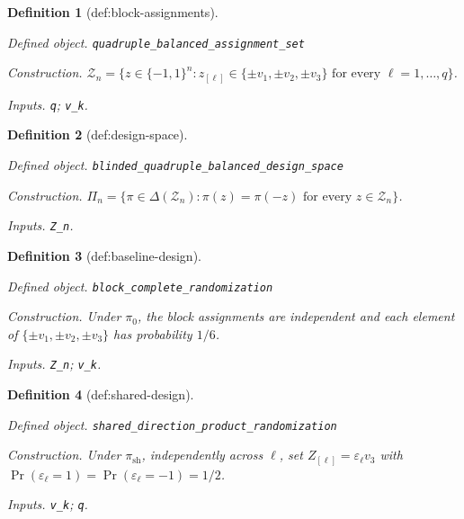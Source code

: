 \documentclass{article}
\newtheorem{definition}{Definition}
\begin{document}
\begin{definition}[def:block-assignments]\label{def:block-assignments}
\par\smallskip\noindent\emph{Defined object.} \texttt{quadruple\_\allowbreak{}balanced\_\allowbreak{}assignment\_\allowbreak{}set}
\par\smallskip\noindent\emph{Construction.} \(\mathcal Z_n=\{z\in\{-1,1\}^n:z_{[\ell]}\in\{\pm v_1,\pm v_2,\pm v_3\}\text{ for every }\ell=1,\ldots,q\}\).
\par\smallskip\noindent\emph{Inputs.} \texttt{q}; \texttt{v\_\allowbreak{}k}.
\end{definition}

\begin{definition}[def:design-space]\label{def:design-space}
\par\smallskip\noindent\emph{Defined object.} \texttt{blinded\_\allowbreak{}quadruple\_\allowbreak{}balanced\_\allowbreak{}design\_\allowbreak{}space}
\par\smallskip\noindent\emph{Construction.} \(\Pi_n=\{\pi\in\Delta(\mathcal Z_n):\pi(z)=\pi(-z)\text{ for every }z\in\mathcal Z_n\}\).
\par\smallskip\noindent\emph{Inputs.} \texttt{Z\_\allowbreak{}n}.
\end{definition}

\begin{definition}[def:baseline-design]\label{def:baseline-design}
\par\smallskip\noindent\emph{Defined object.} \texttt{block\_\allowbreak{}complete\_\allowbreak{}randomization}
\par\smallskip\noindent\emph{Construction.} Under \(\pi_0\), the block assignments are independent and each element of \(\{\pm v_1,\pm v_2,\pm v_3\}\) has probability \(1/6\).
\par\smallskip\noindent\emph{Inputs.} \texttt{Z\_\allowbreak{}n}; \texttt{v\_\allowbreak{}k}.
\end{definition}

\begin{definition}[def:shared-design]\label{def:shared-design}
\par\smallskip\noindent\emph{Defined object.} \texttt{shared\_\allowbreak{}direction\_\allowbreak{}product\_\allowbreak{}randomization}
\par\smallskip\noindent\emph{Construction.} Under \(\pi_{\mathrm{sh}}\), independently across \(\ell\), set \(Z_{[\ell]}=\varepsilon_\ell v_3\) with \(\Pr(\varepsilon_\ell=1)=\Pr(\varepsilon_\ell=-1)=1/2\).
\par\smallskip\noindent\emph{Inputs.} \texttt{v\_\allowbreak{}k}; \texttt{q}.
\end{definition}
\end{document}
